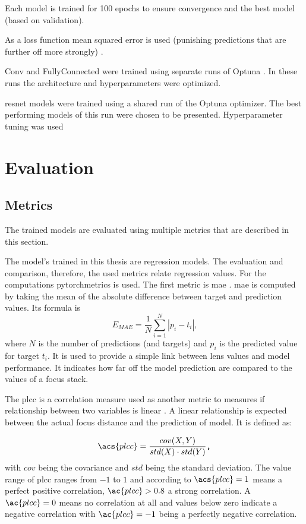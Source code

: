 Each model is trained for 100 epochs to ensure convergence and the best model (based on validation).

As a loss function mean squared error is used (punishing predictions that are further off more strongly) .

Conv and FullyConnected were trained using separate runs of Optuna . In these runs the architecture and hyperparameters were optimized.

\Ac{resnet} models were trained using a shared run of the Optuna  optimizer. The best performing models of this run were chosen to be presented. Hyperparameter tuning was used

\section{Evaluation}
\label{sec:Methods:Evaluation}

\subsection{Metrics}
\label{sec:Methods:Evaluation:Metrics}

The trained models are evaluated using multiple metrics that are described in this section.

The model's trained in this thesis are regression models. The evaluation and comparison, therefore, the used metrics relate regression values. For the computations pytorchmetrics  is used. The first metric is \ac{mae} . \Ac{mae} is computed by taking the mean of the absolute difference between target and prediction values. Its formula is $$E_{MAE} = \frac{1}{N}\sum_{i=1}^N |p_i - t_i| \text{,}$$ where $N$ is the number of predictions (and targets) and $p_i$ is the predicted value for target $t_i$.
It is used to provide a simple link between lens values and model performance. It indicates how far off the model prediction are compared to the values of a focus stack.

The \ac{plcc} \cite{pearson1909determination} is a correlation measure used as another metric to measures if relationship between two variables is linear \cite{profillidis2019statistical}. A linear relationship is expected between the actual focus distance and the prediction of model. It is defined as:

$$\acs{plcc} = \frac{cov(X,Y)}{std(X) \cdot std(Y)} \texttt{,}$$
with $cov$ being the covariance and $std$ being the standard deviation. The value range of \ac{plcc} ranges from $-1$ to $1$ and according to \textcite{profillidis2019statistical} $\acs{plcc} = 1$ means a perfect positive correlation, $\ac{plcc} > 0.8$ a strong correlation. A $\ac{plcc} = 0$ means no correlation at all and values below zero indicate a negative correlation with $\ac{plcc} = -1$ being a perfectly negative correlation.


